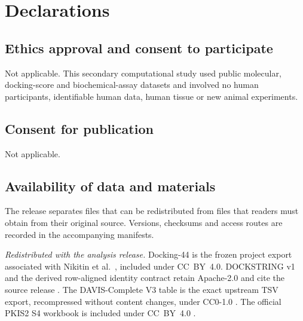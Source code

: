 \section*{Declarations}

\subsection*{Ethics approval and consent to participate}

Not applicable.  This secondary computational study used public molecular,
docking-score and biochemical-assay datasets and involved no human participants,
identifiable human data, human tissue or new animal experiments.

\subsection*{Consent for publication}

Not applicable.

\subsection*{Availability of data and materials}

The release separates files that can be redistributed from files that readers
must obtain from their original source.  Versions, checksums and access routes
are recorded in the accompanying manifests.

\emph{Redistributed with the analysis release.}  Docking-44 is the frozen
project export associated with Nikitin et al.~\cite{nikitin2025}, included under
CC~BY~4.0.  DOCKSTRING v1 and the derived row-aligned identity contract retain
Apache-2.0 and cite the source release \cite{dockstring2022}.  The DAVIS-Complete
V3 table is the exact upstream TSV export, recompressed without content changes,
under CC0-1.0 \cite{davis2011,wu2025davis}.  The official PKIS2 S4 workbook is
included under CC~BY~4.0 \cite{drewry2017}.

